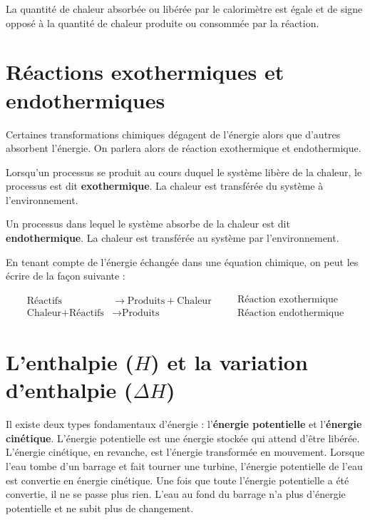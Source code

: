 \documentclass[
  11pt,
  a4paper,
  openany]{book}
\begin{document}
La quantité de chaleur absorbée ou libérée par le calorimètre est égale et de signe opposé à la quantité de chaleur produite ou consommée par la réaction.

\clearpage

\section{Réactions exothermiques et endothermiques}\label{ruxe9actions-exothermiques-et-endothermiques}

Certaines transformations chimiques dégagent de l'énergie alors que d'autres absorbent l'énergie. On parlera alors de réaction exothermique et endothermique.

Lorsqu'un processus se produit au cours duquel le système libère de la chaleur, le processus est dit \textbf{exothermique}. La chaleur est transférée du système à l'environnement.

Un processus dans lequel le système absorbe de la chaleur est dit \textbf{endothermique}. La chaleur est transférée au système par l'environnement.

En tenant compte de l'énergie échangée dans une équation chimique, on peut les écrire de la façon suivante :

\[
\begin{split}
  \text{Réactifs} & \rightarrow \text{Produits} + \text{Chaleur} \\
  \text{Chaleur} + \text{Réactifs} & \rightarrow \text{Produits}
\end{split}
\quad
\begin{split}
  &\text{Réaction exothermique} \\
  &\text{Réaction endothermique}
\end{split}
\]

\section{\texorpdfstring{L'enthalpie (\(H\)) et la variation d'enthalpie (\(\Delta H\))}{L'enthalpie (H) et la variation d'enthalpie (\textbackslash Delta H)}}\label{lenthalpie-h-et-la-variation-denthalpie-delta-h}

Il existe deux types fondamentaux d'énergie : l'\textbf{énergie potentielle} et l'\textbf{énergie cinétique}. L'énergie potentielle est une énergie stockée qui attend d'être libérée. L'énergie cinétique, en revanche, est l'énergie transformée en mouvement. Lorsque l'eau tombe d'un barrage et fait tourner une turbine, l'énergie potentielle de l'eau est convertie en énergie cinétique. Une fois que toute l'énergie potentielle a été convertie, il ne se passe plus rien. L'eau au fond du barrage n'a plus d'énergie potentielle et ne subit plus de changement.
\end{document}
